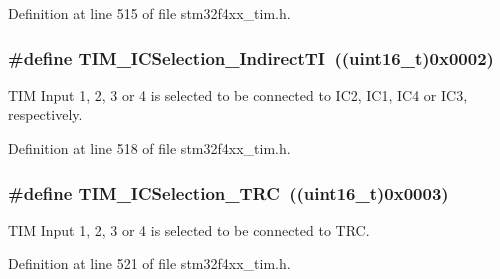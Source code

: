 Definition at line 515 of file stm32f4xx\-\_\-tim.\-h.

\hypertarget{group___t_i_m___input___capture___selection_ga2289b684133ac0b81ddfcd860d01b144}{
\subsubsection[{T\-I\-M\-\_\-\-I\-C\-Selection\-\_\-\-Indirect\-T\-I}]{\setlength{\rightskip}{0pt plus 5cm}\#define T\-I\-M\-\_\-\-I\-C\-Selection\-\_\-\-Indirect\-T\-I~((uint16\-\_\-t)0x0002)}}\label{group___t_i_m___input___capture___selection_ga2289b684133ac0b81ddfcd860d01b144}
T\-I\-M Input 1, 2, 3 or 4 is selected to be connected to I\-C2, I\-C1, I\-C4 or I\-C3, respectively. 

Definition at line 518 of file stm32f4xx\-\_\-tim.\-h.

\hypertarget{group___t_i_m___input___capture___selection_ga2cd464e97ffd6ea3208ec65672f9a373}{
\subsubsection[{T\-I\-M\-\_\-\-I\-C\-Selection\-\_\-\-T\-R\-C}]{\setlength{\rightskip}{0pt plus 5cm}\#define T\-I\-M\-\_\-\-I\-C\-Selection\-\_\-\-T\-R\-C~((uint16\-\_\-t)0x0003)}}\label{group___t_i_m___input___capture___selection_ga2cd464e97ffd6ea3208ec65672f9a373}
T\-I\-M Input 1, 2, 3 or 4 is selected to be connected to T\-R\-C. 

Definition at line 521 of file stm32f4xx\-\_\-tim.\-h.

